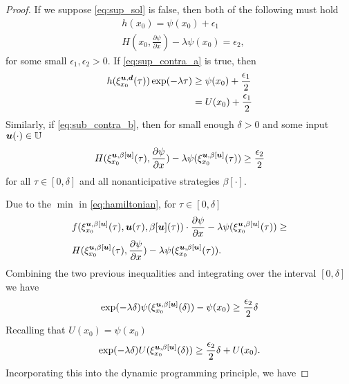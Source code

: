\begin{for_journal}
\begin{proof}
If we suppose \eqref{eq:sup_sol} is false, then both of the following must hold 
%
\begin{subequations}
\begin{align}
&h(x_0) = \psi(x_0) + \epsilon_1 \label{eq:sup_contra_a}\\
&H(x_0,\frac{\partial \psi}{\partial x}) - \lambda \psi(x_0) = \epsilon_2 \label{eq:sup_contra_b},
\end{align} 
\end{subequations}
%
for some small $\epsilon_1, \epsilon_2 > 0$. If \eqref{eq:sup_contra_a} is true, then 
%
\begin{equation}
\begin{split}
h(\xi_{x_0}^{\bm{u}, \bm{d}}(\tau))\exp(-\lambda \tau) &\geq \psi(x_0) + \frac{\epsilon_1}{2} \\ &= U(x_0) + \frac{\epsilon_1}{2}
\end{split}
\end{equation}
%
Similarly, if \eqref{eq:sub_contra_b}, then for small enough $\delta>0$ and  some input $\bm{u}(\cdot) \in \mathbb{U}$ 
%
\begin{equation}
H(\xi_{x_0}^{\bm{u},\beta[\bm{u}]}(\tau), \frac{\partial \psi}{\partial x}) - \lambda \psi(\xi_{x_0}^{\bm{u},\beta[\bm{u}]}(\tau)) \geq \frac{\epsilon_2}{2}
\end{equation}
%
for all $\tau \in [0,\delta]$ and all nonanticipative strategies $\beta[\cdot]$. 

Due to the $\min{}$ in \eqref{eq:hamiltonian}, for $\tau \in [0,\delta]$
%
\begin{equation}
\begin{split}
&f(\xi_{x_0}^{\bm{u},\beta[\bm{u}]}(\tau),\bm{u}(\tau), \beta[\bm{u}](\tau)) \cdot \frac{\partial \psi}{\partial x} - \lambda \psi(\xi_{x_0}^{\bm{u},\beta[\bm{u}]}(\tau)) \geq \\ &H(\xi_{x_0}^{\bm{u},\beta[\bm{u}]}(\tau), \frac{\partial \psi}{\partial x}) - \lambda \psi(\xi_{x_0}^{\bm{u},\beta[\bm{u}]}(\tau)).
\end{split}
\end{equation}
%
Combining the two previous inequalities and integrating over the interval $[0,\delta]$ we have
%
\begin{equation}
\exp(-\lambda \delta)\psi(\xi_{x_0}^{\bm{u},\beta[\bm{u}]}(\delta))-\psi(x_0) \geq \frac{\epsilon_2}{2} \delta
\end{equation}
%
Recalling that $U(x_0)=\psi(x_0)$
%
\begin{equation}
\exp(-\lambda \delta)U(\xi_{x_0}^{\bm{u},\beta[\bm{u}]}(\delta)) \geq \frac{\epsilon_2}{2} \delta + U(x_0).
\end{equation}
%
Incorporating this into the dynamic programming principle, we have
%


\end{proof}
\end{for_journal}
